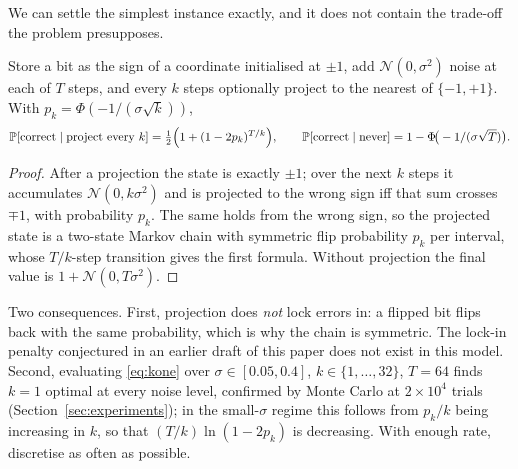We can settle the simplest instance exactly, and it does not contain the
trade-off the problem presupposes.

\begin{proposition}
\label{prop:kone}
Store a bit as the sign of a coordinate initialised at $\pm1$, add
$\mathcal{N}(0,\sigma^2)$ noise at each of $T$ steps, and every $k$ steps
optionally project to the nearest of $\{-1,+1\}$. With $p_k = \Phi(-1/(\sigma\sqrt k))$,
\begin{equation}
  \mathbb{P}[\text{correct} \mid \text{project every } k]
   = \tfrac12\Big(1 + (1-2p_k)^{T/k}\Big),
  \qquad
  \mathbb{P}[\text{correct} \mid \text{never}] = 1 - \Phi\!\big(-1/(\sigma\sqrt T)\big).
  \label{eq:kone}
\end{equation}
\end{proposition}

\begin{proof}
After a projection the state is exactly $\pm1$; over the next $k$ steps it
accumulates $\mathcal{N}(0,k\sigma^2)$ and is projected to the wrong sign iff
that sum crosses $\mp1$, with probability $p_k$. The same holds from the wrong
sign, so the projected state is a two-state Markov chain with symmetric flip
probability $p_k$ per interval, whose $T/k$-step transition gives the first
formula. Without projection the final value is $1 + \mathcal{N}(0,T\sigma^2)$.
\end{proof}

Two consequences. First, projection does \emph{not} lock errors in: a flipped
bit flips back with the same probability, which is why the chain is symmetric.
The lock-in penalty conjectured in an earlier draft of this paper does not
exist in this model. Second, evaluating \eqref{eq:kone} over $\sigma \in [0.05,
0.4]$, $k \in \{1,\dots,32\}$, $T = 64$ finds $k=1$ optimal at every noise
level, confirmed by Monte Carlo at $2\times10^{4}$ trials
(Section~\ref{sec:experiments}); in the small-$\sigma$ regime this follows from
$p_k/k$ being increasing in $k$, so that $(T/k)\ln(1-2p_k)$ is decreasing.
With enough rate, discretise as often as possible.

